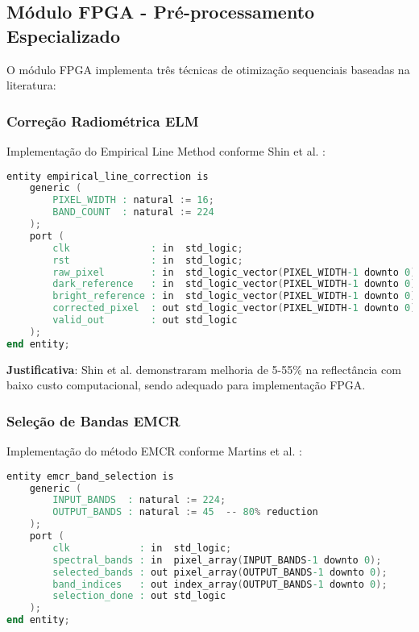 \subsection{Módulo FPGA - Pré-processamento Especializado}

O módulo FPGA implementa três técnicas de otimização sequenciais baseadas na literatura:

\subsubsection{Correção Radiométrica ELM}

Implementação do Empirical Line Method conforme Shin et al. \cite{shin2024}:

\begin{lstlisting}[language=verilog, caption=Módulo ELM em VHDL]
entity empirical_line_correction is
    generic (
        PIXEL_WIDTH : natural := 16;
        BAND_COUNT  : natural := 224
    );
    port (
        clk              : in  std_logic;
        rst              : in  std_logic;
        raw_pixel        : in  std_logic_vector(PIXEL_WIDTH-1 downto 0);
        dark_reference   : in  std_logic_vector(PIXEL_WIDTH-1 downto 0);
        bright_reference : in  std_logic_vector(PIXEL_WIDTH-1 downto 0);
        corrected_pixel  : out std_logic_vector(PIXEL_WIDTH-1 downto 0);
        valid_out        : out std_logic
    );
end entity;
\end{lstlisting}

\textbf{Justificativa}: Shin et al. demonstraram melhoria de 5-55\% na reflectância com baixo custo computacional, sendo adequado para implementação FPGA.

\subsubsection{Seleção de Bandas EMCR}

Implementação do método EMCR conforme Martins et al. \cite{martins2019}:

\begin{lstlisting}[language=verilog, caption=Seleção EMCR em VHDL]
entity emcr_band_selection is
    generic (
        INPUT_BANDS  : natural := 224;
        OUTPUT_BANDS : natural := 45  -- 80% reduction
    );
    port (
        clk            : in  std_logic;
        spectral_bands : in  pixel_array(INPUT_BANDS-1 downto 0);
        selected_bands : out pixel_array(OUTPUT_BANDS-1 downto 0);
        band_indices   : out index_array(OUTPUT_BANDS-1 downto 0);
        selection_done : out std_logic
    );
end entity;
\end{lstlisting}

